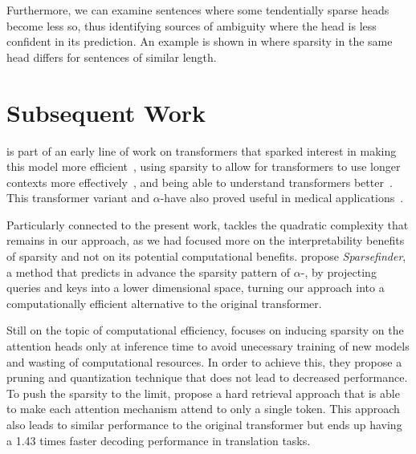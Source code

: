 Furthermore, we can examine sentences where some tendentially sparse
heads become less so, thus identifying sources of ambiguity where the
head is less confident in its prediction. An example is shown in
 where sparsity in the same head differs
for sentences of similar length.

\section{Subsequent Work}\label{sec:subsequent_work_adapt}

\noindent \citet{correia2019adaptively} is part of an early line of work
on transformers that sparked interest in making this model more
efficient~\citep[\textit{inter
        alia}]{daras2020SMYRFEfficientAttention,
    li2020SACAcceleratingStructuring, merrill2021EffectsParameterNorm,
    roy2021EfficientContentBasedSparse}, using sparsity to allow for
transformers to use longer contexts more
effectively~\citep[\textit{inter alia}]{jiang2020LongDocumentRanking,
    qiu2020BlockwiseSelfAttentionLong, sukhbaatar2021NotAllMemories}, and
being able to understand transformers better~\citep[\textit{inter
        alia}]{you2020HardCodedGaussianAttention,
    rogers2020PrimerBERTologyWhat, pande2021headshypothesisunifying}.
This transformer variant and $\alpha$-\entmaxtext have also proved
useful in medical applications~\citep{guo2020LearningLatentForests,
    yun2021SpecTrSpectralTransformer}.

Particularly connected to the present work,
\citet{treviso2021PredictingAttentionSparsity} tackles the quadratic
complexity that remains in our approach, as we had focused more on
the interpretability benefits of sparsity and not on its potential
computational benefits.
\citet{treviso2021PredictingAttentionSparsity} propose
\emph{Sparsefinder}, a method that predicts in advance the sparsity
pattern of $\alpha$-\entmaxtext, by projecting queries and keys into
a lower dimensional space, turning our approach into a
computationally efficient alternative to the original transformer.

Still on the topic of computational efficiency,
\citet{ji2021DistributionSparsityInferencetime} focuses on inducing
sparsity on the attention heads only at inference time to avoid
unecessary training of new models and wasting of computational
resources. In order to achieve this, they propose a pruning and
quantization technique that does not lead to decreased performance.
To push the sparsity to the limit,
\citet{xu2021LearningHardRetrieval} propose a hard retrieval approach
that is able to make each attention mechanism attend to only a single
token. This approach also leads to similar performance to the
original transformer but ends up having a 1.43 times faster decoding
performance in translation tasks.

